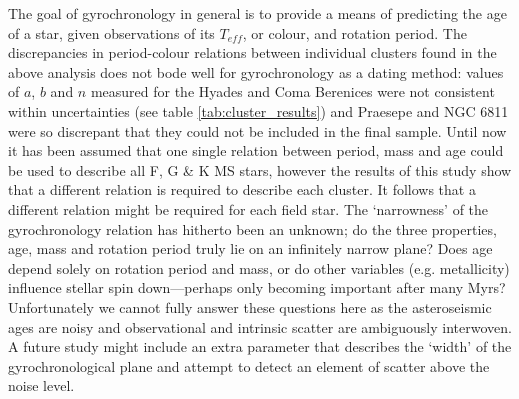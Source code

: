 \documentclass[10pt,preprint]{aastex}
\newcommand{\teff}{$T_{eff}$}
\begin{document}

The goal of gyrochronology in general is to provide a means of predicting the age of a star, given observations of its \teff, or colour, and rotation period.
The discrepancies in period-colour relations between individual clusters found in the above analysis does not bode well for gyrochronology as a dating method: values of $a$, $b$ and $n$ measured for the Hyades and Coma Berenices were not consistent within uncertainties (see table \ref{tab:cluster_results}) and Praesepe and NGC 6811 were so discrepant that they could not be included in the final sample.
Until now it has been assumed that one single relation between period, mass and age could be used to describe all F, G \& K MS stars, however the results of this study show that a different relation is required to describe each cluster.
It follows that a different relation might be required for each field star.
The `narrowness' of the gyrochronology relation has hitherto been an unknown; do the three properties, age, mass and rotation period truly lie on an infinitely narrow plane?
Does age depend solely on rotation period and mass, or do other variables (e.g. metallicity) influence stellar spin down---perhaps only becoming important after many Myrs?
Unfortunately we cannot fully answer these questions here as the asteroseismic ages are noisy and observational and intrinsic scatter are ambiguously interwoven.
A future study might include an extra parameter that describes the `width' of the gyrochronological plane and attempt to detect an element of scatter above the noise level.
\end{document}
